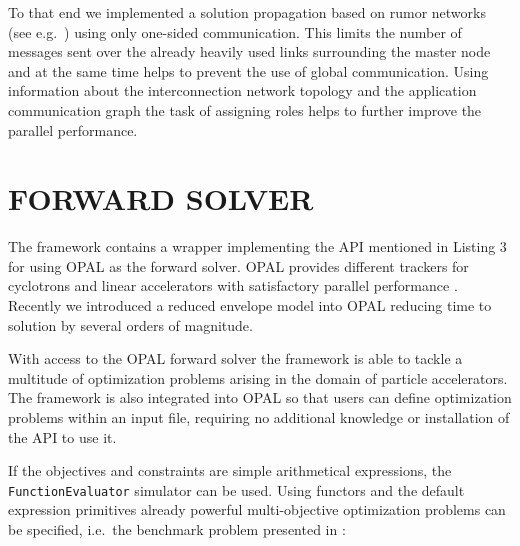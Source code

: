 \documentclass[%
reprint,
amsmath,amssymb,
aps,
prstab,
]{revtex4-1}
\begin{document}
To that end we implemented a solution propagation based on rumor networks (see
  e.g.\ \cite{bgps:06,ayss:09}) using only one-sided communication.
This limits the number of messages sent over the already heavily used links
  surrounding the master node and at the same time helps to prevent the use of
  global communication.
Using information about the interconnection network topology and the
  application communication graph the task of assigning roles helps to further
  improve the parallel performance.



\section{FORWARD SOLVER} \label{sec:forward-solver}

The framework contains a wrapper implementing the API mentioned in
  Listing 3 for using \textsc{OPAL} \cite{opal} as the forward solver.
\textsc{OPAL} provides different trackers for cyclotrons and linear
  accelerators with satisfactory parallel performance \cite{akir:09}.
Recently we introduced a reduced envelope model \cite{iabc:12} into
  \textsc{OPAL} reducing time to solution by several orders of magnitude.

With access to the \textsc{OPAL} forward solver the framework is able to
  tackle a multitude of optimization problems arising in the domain of
  particle accelerators.
  The framework is also integrated into \textsc{OPAL} so that users can 
  define optimization problems within an input file, requiring no 
  additional knowledge or installation of the API to use it.


If the objectives and constraints are simple arithmetical expressions, the
  \texttt{FunctionEvaluator} simulator can be used.
Using functors and the default expression primitives already powerful
  multi-objective optimization problems can be specified, i.e.\ the benchmark
  problem presented in \cite{hbwh:05}:
%
\end{document}
